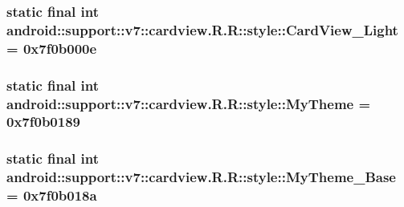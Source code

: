 \hypertarget{classandroid_1_1support_1_1v7_1_1cardview_1_1_r_1_1style_bc9c2b0e42cf23c12b173a6b92e2867d}{
\subsubsection[{CardView\_\-Light}]{\setlength{\rightskip}{0pt plus 5cm}static final int android::support::v7::cardview.R.R::style::CardView\_\-Light = 0x7f0b000e}}
\label{classandroid_1_1support_1_1v7_1_1cardview_1_1_r_1_1style_bc9c2b0e42cf23c12b173a6b92e2867d}


\hypertarget{classandroid_1_1support_1_1v7_1_1cardview_1_1_r_1_1style_1cd1f55547af7e60403586fafaac490e}{
\subsubsection[{MyTheme}]{\setlength{\rightskip}{0pt plus 5cm}static final int android::support::v7::cardview.R.R::style::MyTheme = 0x7f0b0189}}
\label{classandroid_1_1support_1_1v7_1_1cardview_1_1_r_1_1style_1cd1f55547af7e60403586fafaac490e}


\hypertarget{classandroid_1_1support_1_1v7_1_1cardview_1_1_r_1_1style_294385d8a0c1a9bb0d883c6b7c5d5a5e}{
\subsubsection[{MyTheme\_\-Base}]{\setlength{\rightskip}{0pt plus 5cm}static final int android::support::v7::cardview.R.R::style::MyTheme\_\-Base = 0x7f0b018a}}
\label{classandroid_1_1support_1_1v7_1_1cardview_1_1_r_1_1style_294385d8a0c1a9bb0d883c6b7c5d5a5e}


